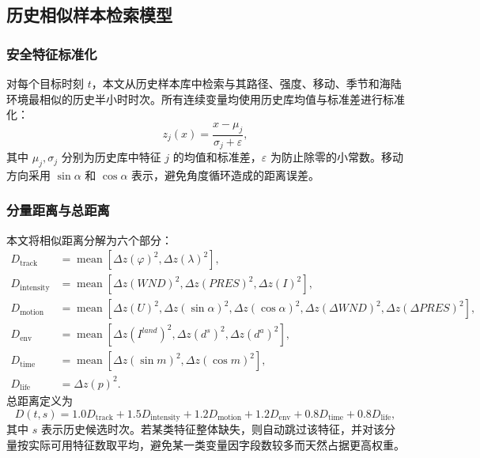 \documentclass[UTF8,a4paper,zihao=5,fontset=fandol]{ctexart}
\numberwithin{equation}{section}
\numberwithin{figure}{section}
\numberwithin{table}{section}
\begin{document}
\subsection{历史相似样本检索模型}

\subsubsection{安全特征标准化}

对每个目标时刻 $t$，本文从历史样本库中检索与其路径、强度、移动、季节和海陆环境最相似的历史半小时时次。所有连续变量均使用历史库均值与标准差进行标准化：
\begin{equation}
z_j(x)=\frac{x-\mu_j}{\sigma_j+\varepsilon},
\end{equation}
其中 $\mu_j,\sigma_j$ 分别为历史库中特征 $j$ 的均值和标准差，$\varepsilon$ 为防止除零的小常数。移动方向采用 $\sin \alpha$ 和 $\cos \alpha$ 表示，避免角度循环造成的距离误差。

\subsubsection{分量距离与总距离}

本文将相似距离分解为六个部分：
\begin{align}
D_{\mathrm{track}} &= \operatorname{mean}\left[
\Delta z(\varphi)^2,\Delta z(\lambda)^2
\right],\\
D_{\mathrm{intensity}} &= \operatorname{mean}\left[
\Delta z(WND)^2,\Delta z(PRES)^2,\Delta z(I)^2
\right],\\
D_{\mathrm{motion}} &= \operatorname{mean}\left[
\Delta z(U)^2,\Delta z(\sin\alpha)^2,\Delta z(\cos\alpha)^2,
\Delta z(\Delta WND)^2,\Delta z(\Delta PRES)^2
\right],\\
D_{\mathrm{env}} &= \operatorname{mean}\left[
\Delta z(I^{land})^2,\Delta z(d^s)^2,\Delta z(d^a)^2
\right],\\
D_{\mathrm{time}} &= \operatorname{mean}\left[
\Delta z(\sin m)^2,\Delta z(\cos m)^2
\right],\\
D_{\mathrm{life}} &= \Delta z(p)^2.
\end{align}
总距离定义为
\begin{equation}
D(t,s)=
1.0D_{\mathrm{track}}
+1.5D_{\mathrm{intensity}}
+1.2D_{\mathrm{motion}}
+1.2D_{\mathrm{env}}
+0.8D_{\mathrm{time}}
+0.8D_{\mathrm{life}},
\end{equation}
其中 $s$ 表示历史候选时次。若某类特征整体缺失，则自动跳过该特征，并对该分量按实际可用特征数取平均，避免某一类变量因字段数较多而天然占据更高权重。
\end{document}
